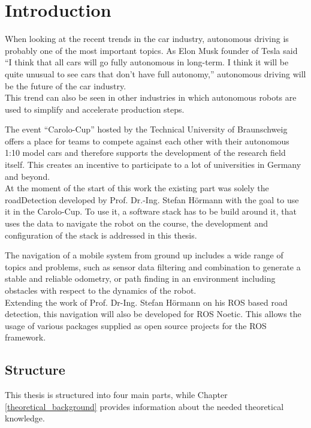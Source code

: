\chapter{Introduction}
\label{introduction}

When looking at the recent trends in the car industry, autonomous driving is probably one of the most important topics. As Elon Musk founder of Tesla said ``I think that all cars will go fully autonomous in long-term. I think it will be quite unusual to see cars that don’t have full autonomy,'' autonomous driving will be the future of the car industry\cite{musk}.\\

This trend can also be seen in other industries  in which autonomous robots are used to simplify and accelerate production steps. 



The event ``Carolo-Cup'' hosted by the Technical University of Braunschweig offers a place for teams to compete against each other with their autonomous 1:10 model cars and therefore supports the development of the research field itself. This creates an incentive to participate to a lot of universities in Germany and beyond.\\

At the moment of the start of this work the existing part was solely the roadDetection developed by Prof. Dr.-Ing. Stefan Hörmann with the goal to use it in the Carolo-Cup. To use it, a software stack has to be build around it, that uses the data to navigate the robot on the course, the development and configuration of the stack is addressed in this thesis.


The navigation of a mobile system from ground up includes a wide range of topics and problems, such as sensor data filtering and combination to generate a stable and reliable odometry, or path finding in an environment including obstacles with respect to the dynamics of the robot.\\

Extending the work of Prof. Dr-Ing. Stefan Hörmann on his ROS based road detection, this navigation will also be developed for ROS Noetic. This allows the usage of various packages supplied as open source projects for the ROS framework.

\section{Structure}

This thesis is structured into four main parts, while Chapter \ref{theoretical_background} provides information about the needed theoretical knowledge.


